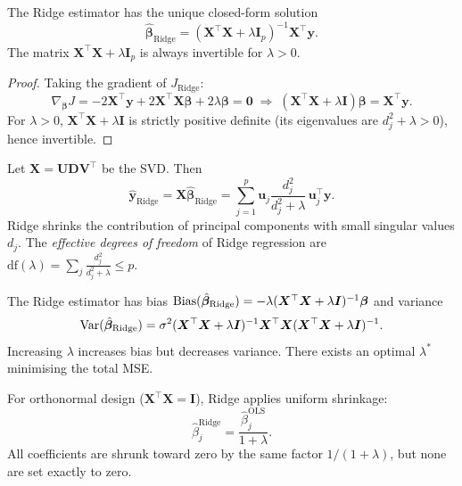 \begin{theorem}\label{thm:ridge}
The Ridge estimator has the unique closed-form solution
\[
    \hat{\bm{\beta}}_{\text{Ridge}} = (\bm{X}^\top\bm{X} + \lambda\bm{I}_p)^{-1}\bm{X}^\top\bm{y}.
\]
The matrix $\bm{X}^\top\bm{X} + \lambda\bm{I}_p$ is always invertible for $\lambda > 0$.
\end{theorem}

\begin{proof}
Taking the gradient of $J_{\text{Ridge}}$:
\[
    \nabla_{\bm{\beta}} J = -2\bm{X}^\top\bm{y} + 2\bm{X}^\top\bm{X}\bm{\beta} + 2\lambda\bm{\beta} = \bm{0}
    \;\Longrightarrow\;
    (\bm{X}^\top\bm{X} + \lambda\bm{I})\bm{\beta} = \bm{X}^\top\bm{y}.
\]
For $\lambda > 0$, $\bm{X}^\top\bm{X} + \lambda\bm{I}$ is strictly positive definite (its eigenvalues are $d_j^2 + \lambda > 0$), hence invertible.
\end{proof}

\begin{proposition}
Let $\bm{X} = \bm{U}\bm{D}\bm{V}^\top$ be the SVD. Then
\[
    \hat{\bm{y}}_{\text{Ridge}} = \bm{X}\hat{\bm{\beta}}_{\text{Ridge}}
    = \sum_{j=1}^{p} \bm{u}_j \frac{d_j^2}{d_j^2 + \lambda}\,\bm{u}_j^\top\bm{y}.
\]
Ridge shrinks the contribution of principal components with small singular values $d_j$. The \emph{effective degrees of freedom} of Ridge regression are $\text{df}(\lambda) = \sum_j \frac{d_j^2}{d_j^2+\lambda} \leq p$.
\end{proposition}

\begin{theorem}
The Ridge estimator has bias $\mathrm{Bias}(\hat{\bm{\beta}}_{\text{Ridge}}) = -\lambda(\bm{X}^\top\bm{X}+\lambda\bm{I})^{-1}\bm{\beta}$ and variance
\[
    \mathrm{Var}(\hat{\bm{\beta}}_{\text{Ridge}}) = \sigma^2(\bm{X}^\top\bm{X}+\lambda\bm{I})^{-1}\bm{X}^\top\bm{X}(\bm{X}^\top\bm{X}+\lambda\bm{I})^{-1}.
\]
Increasing $\lambda$ increases bias but decreases variance. There exists an optimal $\lambda^*$ minimising the total MSE.
\end{theorem}

\begin{proposition}
For orthonormal design ($\bm{X}^\top\bm{X} = \bm{I}$), Ridge applies uniform shrinkage:
\[
    \hat{\beta}_j^{\text{Ridge}} = \frac{\hat{\beta}_j^{\text{OLS}}}{1+\lambda}.
\]
All coefficients are shrunk toward zero by the same factor $1/(1+\lambda)$, but none are set exactly to zero.
\end{proposition}

